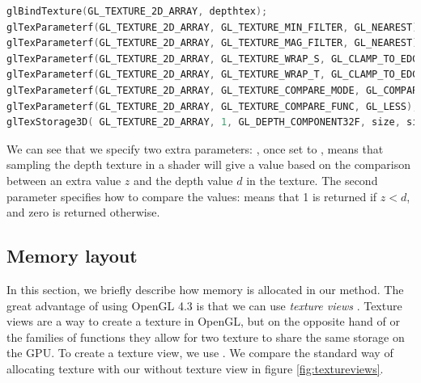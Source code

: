 \begin{lstlisting}[language=C++,label=lst:textureconfshadow,caption={Configuration of a shadow map depth texture.}]
glBindTexture(GL_TEXTURE_2D_ARRAY, depthtex);
glTexParameterf(GL_TEXTURE_2D_ARRAY, GL_TEXTURE_MIN_FILTER, GL_NEAREST);
glTexParameterf(GL_TEXTURE_2D_ARRAY, GL_TEXTURE_MAG_FILTER, GL_NEAREST);
glTexParameterf(GL_TEXTURE_2D_ARRAY, GL_TEXTURE_WRAP_S, GL_CLAMP_TO_EDGE);
glTexParameterf(GL_TEXTURE_2D_ARRAY, GL_TEXTURE_WRAP_T, GL_CLAMP_TO_EDGE);
glTexParameterf(GL_TEXTURE_2D_ARRAY, GL_TEXTURE_COMPARE_MODE, GL_COMPARE_REF_TO_TEXTURE);
glTexParameterf(GL_TEXTURE_2D_ARRAY, GL_TEXTURE_COMPARE_FUNC, GL_LESS);
glTexStorage3D(	GL_TEXTURE_2D_ARRAY, 1, GL_DEPTH_COMPONENT32F, size, size, layers);
\end{lstlisting}

We can see that we specify two extra parameters: , once set to , means that sampling the depth texture in a shader will give a value based on the comparison between an extra value $z$ and the depth value $d$ in the texture. The second parameter  specifies how to compare the values:  means that 1 is returned if $z<d$, and zero is returned otherwise. 

\subsection{Memory layout}
\label{sec:memorylayout}

In this section, we briefly describe how memory is allocated in our method. The great advantage of using OpenGL 4.3 is that we can use \emph{texture views} \citep{openglspec}. Texture views are a way to create a texture in OpenGL, but on the opposite hand of  or the  families of functions they allow for two texture to share the same storage on the GPU. To create a texture view, we use . We compare the standard way of allocating texture with our without texture view in figure \ref{fig:textureviews}.

